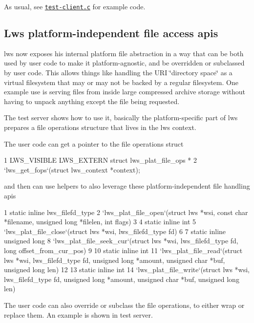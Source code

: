 As usual, see \href{test-server/test-client.c}{\tt test-\/client.\+c} for example code.

\subsection*{Lws platform-\/independent file access apis }

lws now exposes his internal platform file abstraction in a way that can be both used by user code to make it platform-\/agnostic, and be overridden or subclassed by user code. This allows things like handling the U\+RI \char`\"{}directory
space\char`\"{} as a virtual filesystem that may or may not be backed by a regular filesystem. One example use is serving files from inside large compressed archive storage without having to unpack anything except the file being requested.

The test server shows how to use it, basically the platform-\/specific part of lws prepares a file operations structure that lives in the lws context.

The user code can get a pointer to the file operations struct


\begin{DoxyCode}
1 LWS\_VISIBLE LWS\_EXTERN struct lws\_plat\_file\_ops *
2         `lws\_get\_fops`(struct lws\_context *context);
\end{DoxyCode}


and then can use helpers to also leverage these platform-\/independent file handling apis


\begin{DoxyCode}
1 static inline lws\_filefd\_type
2 `lws\_plat\_file\_open`(struct lws *wsi, const char *filename, unsigned long *filelen, int flags)
3 
4 static inline int
5 `lws\_plat\_file\_close`(struct lws *wsi, lws\_filefd\_type fd)
6 
7 static inline unsigned long
8 `lws\_plat\_file\_seek\_cur`(struct lws *wsi, lws\_filefd\_type fd, long offset\_from\_cur\_pos)
9 
10 static inline int
11 `lws\_plat\_file\_read`(struct lws *wsi, lws\_filefd\_type fd, unsigned long *amount, unsigned char *buf,
       unsigned long len)
12 
13 static inline int
14 `lws\_plat\_file\_write`(struct lws *wsi, lws\_filefd\_type fd, unsigned long *amount, unsigned char *buf,
       unsigned long len)
\end{DoxyCode}


The user code can also override or subclass the file operations, to either wrap or replace them. An example is shown in test server.

